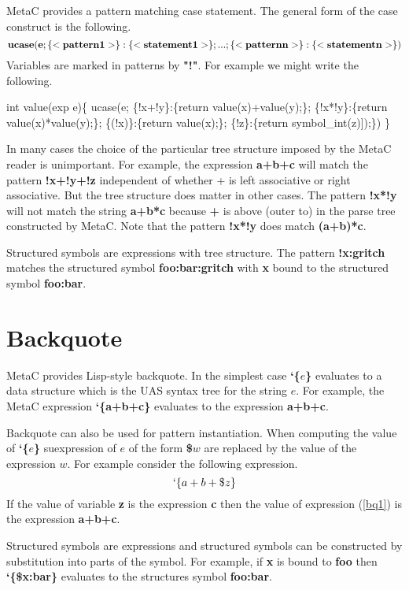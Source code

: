 \documentclass{article}
\begin{document}
MetaC provides a pattern matching case statement.
The general form of the case construct is the following.
$${\bf ucase(e; \{<pattern1>\}:\{<statement1>\}; ... ;\{<patternn>\}:\{<statementn>\})}$$
Variables are marked in patterns by {\bf"!"}. For example we might write the following.

\begin{code}
int value(exp e)\{
  ucase(e;
   \{!x+!y\}:\{return value(x)+value(y);\};
   \{!x*!y\}:\{return value(x)*value(y);\};
   \{(!x)\}:\{return value(x);\};
   \{!z\}:\{return symbol\_int(z)]);\})
\}
\end{code}

In many cases the choice of the particular tree structure imposed by the MetaC reader is unimportant.  For example, the expression {\bf a+b+c} will match the pattern
{\bf !x+!y+!z} independent of whether + is left associative or right associative.  But the tree structure does matter in other cases.  The pattern {\bf !x*!y}
will not match the string {\bf a+b*c} because {\bf +} is above (outer to) {\bf *} in the parse tree constructed by MetaC. Note that the pattern {\bf !x*!y} does match {\bf (a+b)*c}.

Structured symbols are expressions with tree structure.  The pattern {\bf !x:gritch} matches the structured symbol {\bf foo:bar:gritch} with {\bf x} bound to the structured symbol {\bf foo:bar}.

\section{Backquote}

MetaC provides Lisp-style backquote.
In the simplest case {\bf `\{$e$\}} evaluates to a data structure which is the UAS syntax tree for
the string $e$.  For example, the MetaC expression {\bf `\{a+b+c\}}
evaluates to the expression {\bf a+b+c}.

Backquote can also be used for pattern instantiation.
When computing the value of {\bf `\{$e$\}} suexpression of $e$ of the form {\bf \$$w$} are replaced by the value of the expression $w$.
For example consider the following expression.
\begin{equation}
\label{bq1}
`\{a+b+\$z\}
\end{equation}
If the value of variable {\bf z} is the expression {\bf c} then the value of expression (\ref{bq1}) is the expression {\bf a+b+c}.

Structured symbols are expressions and structured symbols can be constructed by substitution into parts of the symbol.
For example, if {\bf x} is bound to {\bf foo} then {\bf `\{\$x:bar\}} evaluates to the structures symbol {\bf foo:bar}.
\end{document}
